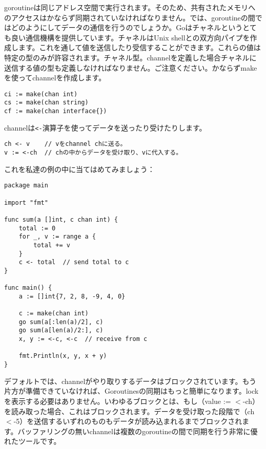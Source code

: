 goroutineは同じアドレス空間で実行されます。そのため、共有されたメモリへのアクセスはかならず同期されていなければなりません。では、goroutineの間ではどのようにしてデータの通信を行うのでしょうか。Goはチャネルというとても良い通信機構を提供しています。チャネルはUnix shellとの双方向パイプを作成します。これを通して値を送信したり受信することができます。これらの値は特定の型のみが許容されます。チャネル型。channelを定義した場合チャネルに送信する値の型も定義しなければなりません。ご注意ください。かならずmakeを使ってchannelを作成します。

\begin{lstlisting}[numbers=none]
ci := make(chan int)
cs := make(chan string)
cf := make(chan interface{})
\end{lstlisting}

channelは\texttt{<-}演算子を使ってデータを送ったり受けたりします。

\begin{lstlisting}[numbers=none]
ch <- v    // vをchannel chに送る。
v := <-ch  // chの中からデータを受け取り、vに代入する。
\end{lstlisting}

これを私達の例の中に当てはめてみましょう：

\begin{lstlisting}[numbers=none]
package main

import "fmt"

func sum(a []int, c chan int) {
    total := 0
    for _, v := range a {
        total += v
    }
    c <- total  // send total to c
}

func main() {
    a := []int{7, 2, 8, -9, 4, 0}

    c := make(chan int)
    go sum(a[:len(a)/2], c)
    go sum(a[len(a)/2:], c)
    x, y := <-c, <-c  // receive from c

    fmt.Println(x, y, x + y)
}
\end{lstlisting}

デフォルトでは、channelがやり取りするデータはブロックされています。もう片方が準備できていなければ、Goroutinesの同期はもっと簡単になります。lockを表示する必要はありません。いわゆるブロックとは、もし（value := $<$-ch）を読み取った場合、これはブロックされます。データを受け取った段階で（ch$<$-5）を送信するいずれのものもデータが読み込まれるまでブロックされます。バッファリングの無いchannelは複数のgoroutineの間で同期を行う非常に優れたツールです。


